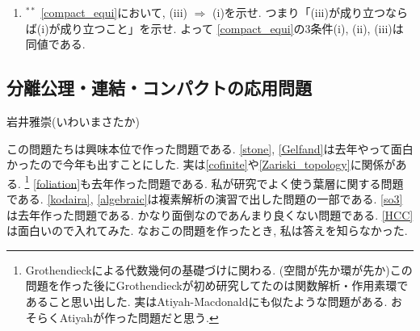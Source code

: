 \documentclass[dvipdfmx,a4paper,11pt]{article}
\theoremstyle{definition}
\begin{document}
\begin{enumerate}[label=\textbf{問}\ref*{sec-compact}.\arabic*]
\item $^{**}$ \ref{compact_equi}において, (iii) $\Rightarrow$ (i)を示せ. つまり「(iii)が成り立つならば(i)が成り立つこと」を示せ. よって \ref{compact_equi}の3条件(i), (ii), (iii)は同値である.


 \end{enumerate}




\newpage




	
	



\begin{center}
\section{分離公理・連結・コンパクトの応用問題}
\label{sec-compact_continue}
\end{center}

\begin{flushright}
 岩井雅崇(いわいまさたか)
\end{flushright}




この問題たちは興味本位で作った問題である.  %
\ref{stone}, \ref{Gelfand}は去年やって面白かったので今年も出すことにした. 実は\ref{cofinite}や\ref{Zariski_topology}に関係がある. \footnote{Grothendieckによる代数幾何の基礎づけに関わる. (空間が先か環が先か)この問題を作った後にGrothendieckが初め研究してたのは関数解析・作用素環であること思い出した. 実はAtiyah-Macdonaldにも似たような問題がある. おそらくAtiyahが作った問題だと思う.} \ref{foliation}も去年作った問題である. 私が研究でよく使う葉層に関する問題である.
 \ref{kodaira}, \ref{algebraic}は複素解析の演習で出した問題の一部である. %
 \ref{so3}は去年作った問題である. かなり面倒なのであんまり良くない問題である. \ref{HCC}は面白いので入れてみた. なおこの問題を作ったとき, 私は答えを知らなかった. 
\end{document}
